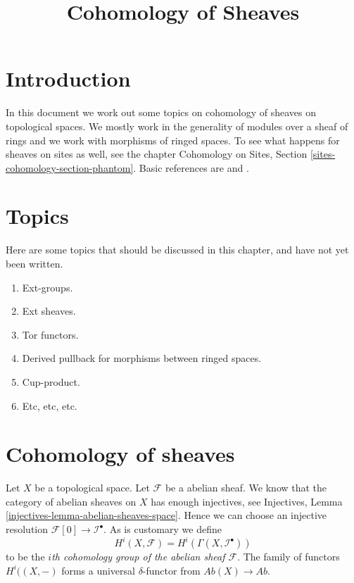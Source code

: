

%


\title{Cohomology of Sheaves}


\maketitle

\label{section-phantom}

\tableofcontents

\section{Introduction}
\label{section-introduction}

\noindent
In this document we work out some topics on cohomology of sheaves
on topological spaces. We mostly work in the generality of modules
over a sheaf of rings and we work with morphisms of ringed spaces.
To see what happens for sheaves on sites as well,
see the chapter
Cohomology on Sites, Section \ref{sites-cohomology-section-phantom}.
Basic references are \cite{Godement} and \cite{Iversen}.


\section{Topics}
\label{section-topics}

\noindent
Here are some topics that should be discussed in this chapter,
and have not yet been written.
\begin{enumerate}
\item Ext-groups.
\item Ext sheaves.
\item Tor functors.
\item Derived pullback for morphisms between ringed spaces.
\item Cup-product.
\item Etc, etc, etc.
\end{enumerate}



\section{Cohomology of sheaves}
\label{section-cohomology-sheaves}

\noindent
Let $X$ be a topological space. Let $\mathcal{F}$ be a abelian sheaf.
We know that the category of abelian sheaves on $X$ has enough injectives, see
Injectives, Lemma \ref{injectives-lemma-abelian-sheaves-space}.
Hence we can choose an injective resolution
$\mathcal{F}[0] \to \mathcal{I}^\bullet$. As is customary we define
\begin{equation}
\label{equation-cohomology}
H^i(X, \mathcal{F}) = H^i(\Gamma(X, \mathcal{I}^\bullet))
\end{equation}
to be the {\it $i$th cohomology group of the abelian sheaf $\mathcal{F}$}.
The family of functors $H^i((X, -)$ forms a universal $\delta$-functor
from $\textit{Ab}(X) \to \textit{Ab}$.

